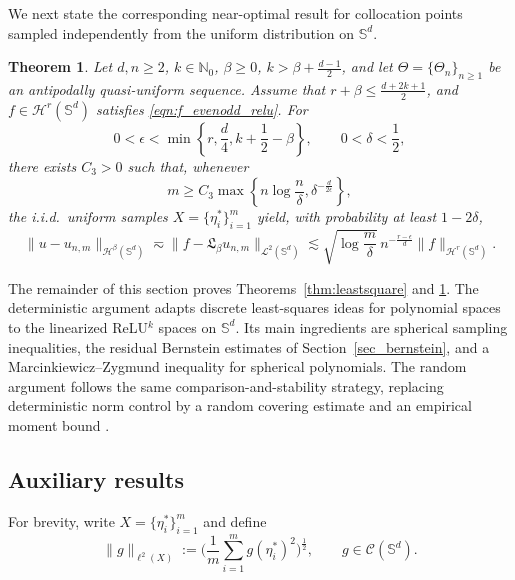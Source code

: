 \documentclass{article}
\numberwithin{equation}{section}
\newtheorem{theorem}{Theorem}
\def\NN{\mathbb{N}}
\def\SS{\mathbb{S}}
\def\sul{\sum\limits}
\begin{document}
We next state the corresponding near-optimal result for collocation points sampled independently from the uniform distribution on $\SS^d$.

\begin{theorem}\label{thm:leastsquare_random}
Let $d,n\geq2$, $k\in\NN_0$, $\beta\geq0$, $k>\beta+\frac{d-1}{2}$, and let $\Theta=\{\Theta_n\}_{n\geq1}$ be an antipodally quasi-uniform sequence. Assume that $r+\beta\leq\frac{d+2k+1}{2}$, and $f\in\mathcal H^r(\SS^d)$ satisfies \eqref{eqn:f_evenodd_relu}. For
\begin{equation*}
0<\epsilon<\min\left\{r,\frac d4,k+\frac12-\beta\right\},\qquad0<\delta<\frac12,
\end{equation*}
there exists $C_3>0$ such that, whenever
\begin{equation*}
m\geq C_3\max\left\{n\log\frac n\delta,\delta^{-\frac{d}{2\epsilon}}\right\},
\end{equation*}
the i.i.d.\ uniform samples $X=\{\eta_i^*\}_{i=1}^m$ yield, with probability at least $1-2\delta$,
\begin{equation}\label{eqn:random_residual_result}
\|u-u_{n,m}\|_{\mathcal H^\beta(\SS^d)}\eqsim\|f-\mathfrak L_\beta u_{n,m}\|_{\mathcal L^2(\SS^d)}\lesssim\sqrt{\log\frac m\delta}\,n^{-\frac{r-\epsilon}{d}}\|f\|_{\mathcal H^r(\SS^d)}.
\end{equation}
\end{theorem}



The remainder of this section proves Theorems~\ref{thm:leastsquare} and \ref{thm:leastsquare_random}. The deterministic argument adapts discrete least-squares ideas for polynomial spaces \cite{cohen2017optimal} to the linearized ReLU$^k$ spaces on $\SS^d$. Its main ingredients are spherical sampling inequalities, the residual Bernstein estimates of Section~\ref{sec_bernstein}, and a Marcinkiewicz--Zygmund inequality for spherical polynomials. The random argument follows the same comparison-and-stability strategy, replacing deterministic norm control by a random covering estimate and an empirical moment bound \cite{wainwright2019high,vershynin2018high,mhaskar2001spherical}.


\subsection{Auxiliary results}
For brevity, write $X=\{\eta_i^*\}_{i=1}^m$ and define
\begin{equation}
    \|g\|_{\ell^2(X)}:=\Big(\frac{1}{m}\sul_{i=1}^mg(\eta_i^*)^2\Big)^{\frac{1}{2}},\qquad g\in\mathcal{C}(\SS^d).
\end{equation}
\end{document}
